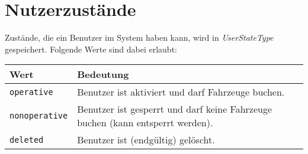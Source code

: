 \section{Nutzerzustände}
\label{sec:CodeTabellen:UserStateType}

Zustände, die ein Benutzer im System haben kann, wird in  \emph{UserStateType} gespeichert. Folgende Werte sind dabei erlaubt:

\begin{flushleft}
\begin{tabularx}{\linewidth}{l>{\raggedright\arraybackslash}X}
\toprule
Wert & Bedeutung\\
\midrule
\verb|operative| & Benutzer ist aktiviert und darf Fahrzeuge buchen.\\
\verb|nonoperative| & Benutzer ist gesperrt und darf keine Fahrzeuge buchen (kann entsperrt werden).\\
\verb|deleted| & Benutzer ist (endgültig) gelöscht.\\
\bottomrule
\end{tabularx}
\end{flushleft}
